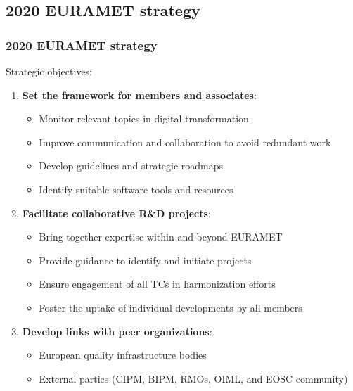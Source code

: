 \documentclass{beamer}
\begin{document}
    \subsection{2020 EURAMET strategy}

    \begin{frame}
        \frametitle{2020 EURAMET strategy}
        Strategic objectives:
        \begin{enumerate}
            \item \textbf{Set the framework for members and associates}:
            \begin{itemize}
                \footnotesize
                \item Monitor relevant topics in digital transformation
                \item Improve communication and collaboration to avoid redundant work
                \item Develop guidelines and strategic roadmaps
                \item Identify suitable software tools and resources
            \end{itemize}
            \item \textbf{Facilitate collaborative R\&D projects}:
            \begin{itemize}
                \footnotesize
                \item Bring together expertise within and beyond EURAMET
                \item Provide guidance to identify and initiate projects
                \item Ensure engagement of all TCs in harmonization efforts
                \item Foster the uptake of individual developments by all members
            \end{itemize}
            \item \textbf{Develop links with peer organizations}:
            \begin{itemize}
                \footnotesize
                \item European quality infrastructure bodies
                \item External parties (CIPM, BIPM, RMOs, OIML, and EOSC community)
            \end{itemize}
        \end{enumerate}
    \end{frame}
\end{document}
